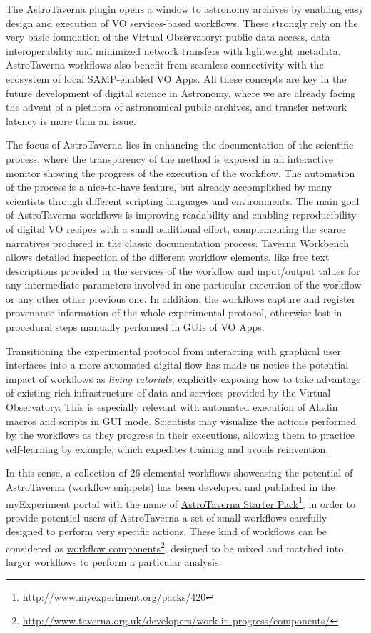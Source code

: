 \documentclass{aa}
\newcommand{\urlsamefont}[1]{\urlstyle{same}\url{#1}}
\newcommand{\hrefnote}[2]{\href{#1}{#2}\footnote{\urlsamefont{#1}}}
\begin{document}
The AstroTaverna plugin opens a window to astronomy archives by enabling easy design and execution of VO services-based workflows. These strongly rely on the very basic foundation of the Virtual Observatory: public data access, data interoperability and minimized network transfers with lightweight metadata. AstroTaverna workflows also benefit from seamless connectivity with the ecosystem of local SAMP-enabled VO Apps. All these concepts are key in the future development of digital science in Astronomy, where we are already facing the advent of a plethora of astronomical public archives, and transfer network latency is more than an issue. 

The focus of AstroTaverna lies in enhancing the documentation of the scientific process, where the transparency of the method is exposed in an interactive monitor showing the progress of the execution of the workflow. The automation of the process is a nice-to-have feature, but already accomplished by many scientists through different scripting languages and environments. The main goal of AstroTaverna workflows is improving readability and enabling reproducibility of digital VO recipes with a small additional effort, complementing the scarce narratives produced in the classic documentation process. Taverna Workbench allows detailed inspection of the different workflow elements, like free text descriptions provided in the services of the workflow and input/output values for any intermediate parameters involved in one particular execution of the workflow or any other other previous one. In addition, the workflows capture and register provenance information of the whole experimental protocol, otherwise lost in procedural steps manually performed in GUIs of VO Apps.

Transitioning the experimental protocol from interacting with graphical user interfaces into a more automated digital flow has made us notice the potential impact of workflows as \textit{living tutorials}, explicitly exposing how to take advantage of existing rich infrastructure of data and services provided by the Virtual Observatory. This is especially relevant with automated execution of Aladin macros and scripts in GUI mode. Scientists may visualize the actions performed by the workflows as they progress in their executions, allowing them to practice self-learning by example, which expedites training and avoids reinvention. 

In this sense, a collection of 26 elemental workflows showcasing the potential of AstroTaverna (workflow snippets) has been developed and published in the myExperiment portal with the name of \hrefnote{http://www.myexperiment.org/packs/420}{\label{starterpack}AstroTaverna Starter Pack}, in order to provide potential users of AstroTaverna a set of small workflows carefully designed to perform very specific actions. These kind of workflows can be considered as \hrefnote{http://www.taverna.org.uk/developers/work-in-progress/components/}{workflow components}, designed to be mixed and matched into larger workflows to perform a particular analysis. 
\end{document}
